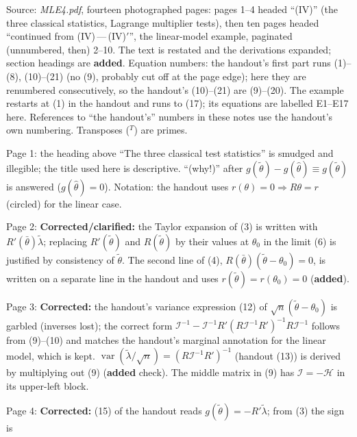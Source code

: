 \documentclass[11pt]{article}
\begin{document}
\clearpage
\begin{transcriptnotes}
 \item Source: \emph{MLE4.pdf}, fourteen photographed pages: pages 1--4 headed ``(IV)'' (the three classical
       statistics, Lagrange multiplier tests), then ten pages headed ``continued from (IV)\,---\,(IV)$'$'',
       the linear-model example, paginated (unnumbered, then) 2--10. The text is restated and the
       derivations expanded; section headings are \textbf{added}. Equation numbers: the handout's first part
       runs (1)--(8), (10)--(21) (no (9), probably cut off at the page edge); here they are renumbered
       consecutively, so the handout's (10)--(21) are (9)--(20). The example restarts at (1) in the
       handout and runs to (17); its equations are labelled E1--E17 here. References to ``the handout's''
       numbers in these notes use the handout's own numbering. Transposes ($^{T}$) are primes.
 \item Page 1: the heading above ``The three classical test statistics'' is smudged and illegible; the
       title used here is descriptive. ``(why!)'' after $g(\tilde\theta)-g(\hat\theta)\equiv g(\tilde\theta)$ is
       answered ($g(\hat\theta)=0$). Notation: the handout uses $r(\theta)=0\Rightarrow R\theta=r$ (circled) for the linear case.
 \item Page 2: \textbf{Corrected/clarified:} the Taylor expansion of (3) is written with $R'(\bar\theta)\tilde\lambda$;
       replacing $R'(\tilde\theta)$ and $R(\tilde\theta)$ by their values at $\theta_{0}$ in the limit (6) is
       justified by consistency of $\tilde\theta$. The second line of (4), $R(\bar\theta)(\tilde\theta-\theta_{0})=0$,
       is written on a separate line in the handout and uses $r(\tilde\theta)=r(\theta_{0})=0$ (\textbf{added}).
 \item Page 3: \textbf{Corrected:} the handout's variance expression (12) of $\sqrt n(\tilde\theta-\theta_{0})$ is garbled
       (inverses lost); the correct form $\mathcal I^{-1}-\mathcal I^{-1}R'(R\mathcal I^{-1}R')^{-1}R\mathcal I^{-1}$ follows from
       (9)--(10) and matches the handout's marginal annotation for the linear model, which is kept.
       $\operatorname{var}(\tilde\lambda/\sqrt n)=(R\mathcal I^{-1}R')^{-1}$ (handout (13)) is derived by multiplying out
       (9) (\textbf{added} check). The middle matrix in (9) has $\mathcal I=-\mathcal H$ in its upper-left block.
 \item Page 4: \textbf{Corrected:} (15) of the handout reads $g(\tilde\theta)=-R'\tilde\lambda$; from (3) the sign is

\end{transcriptnotes}
\end{document}
